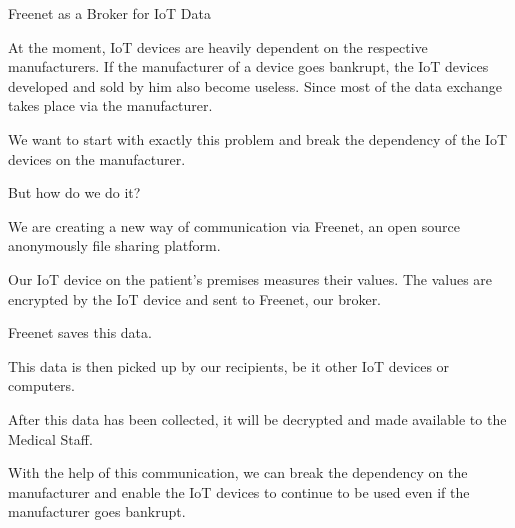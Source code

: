 Freenet as a Broker for IoT Data

At the moment, IoT devices are heavily dependent on the respective manufacturers. If the manufacturer of a device goes bankrupt, the IoT devices developed and sold by him also become useless. Since most of the data exchange takes place via the manufacturer.

We want to start with exactly this problem and break the dependency of the IoT devices on the manufacturer.

But how do we do it?

We are creating a new way of communication via Freenet, an open source anonymously file sharing platform.

Our IoT device on the patient's premises measures their values.
The values ​​are encrypted by the IoT device and sent to Freenet, our broker.

Freenet saves this data.

This data is then picked up by our recipients, be it other IoT devices or computers.

After this data has been collected, it will be decrypted and made available to the Medical Staff.

With the help of this communication, we can break the dependency on the manufacturer and enable the IoT devices to continue to be used even if the manufacturer goes bankrupt.